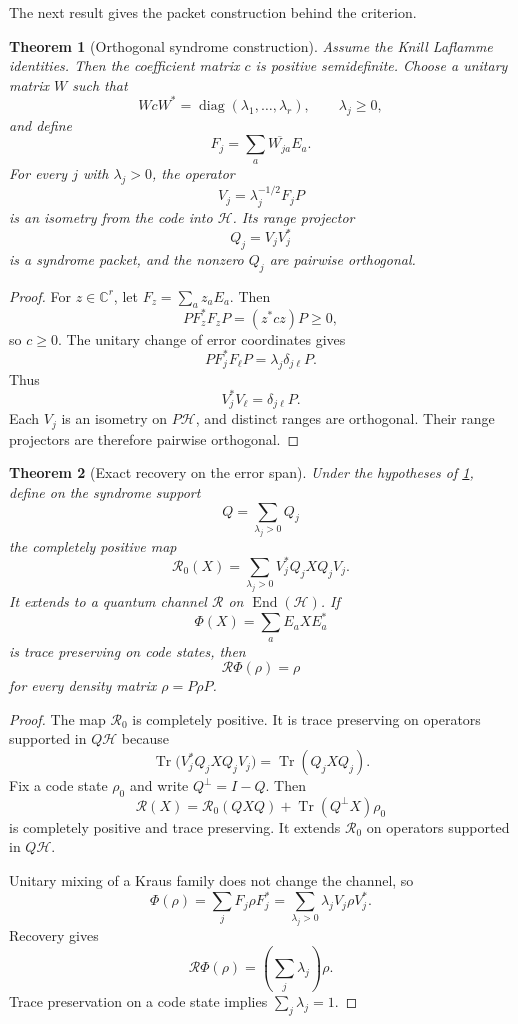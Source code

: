 \documentclass{aomart}
\newtheorem{theorem}{Theorem}[section]
\theoremstyle{definition}
\theoremstyle{remark}
\newcommand{\CC}{\mathbb C}
\newcommand{\Hcal}{\mathcal H}
\newcommand{\Rcal}{\mathcal R}
\newcommand{\End}{\operatorname{End}}
\newcommand{\Tr}{\operatorname{Tr}}
\newcommand{\diag}{\operatorname{diag}}
\begin{document}
The next result gives the packet construction behind the criterion.

\begin{theorem}[Orthogonal syndrome construction]\label{thm:syndrome_construction}
Assume the Knill Laflamme identities. Then the coefficient matrix \(c\) is positive semidefinite. Choose a unitary matrix \(W\) such that
\[
WcW^*=\diag(\lambda_1,\ldots,\lambda_r),
\qquad
\lambda_j\geq0,
\]
and define
\[
F_j=\sum_a\overline{W_{ja}}E_a.
\]
For every \(j\) with \(\lambda_j>0\), the operator
\[
V_j=\lambda_j^{-1/2}F_jP
\]
is an isometry from the code into \(\Hcal\). Its range projector
\[
Q_j=V_jV_j^*
\]
is a syndrome packet, and the nonzero \(Q_j\) are pairwise orthogonal.
\end{theorem}

\begin{proof}
For \(z\in\CC^r\), let \(F_z=\sum_az_aE_a\). Then
\[
PF_z^*F_zP=(z^*cz)P\geq0,
\]
so \(c\geq0\). The unitary change of error coordinates gives
\[
PF_j^*F_\ell P
=
\lambda_j\delta_{j\ell}P.
\]
Thus
\[
V_j^*V_\ell=\delta_{j\ell}P.
\]
Each \(V_j\) is an isometry on \(P\Hcal\), and distinct ranges are orthogonal. Their range projectors are therefore pairwise orthogonal.
\end{proof}

\begin{theorem}[Exact recovery on the error span]\label{thm:exact_recovery}
Under the hypotheses of \cref{thm:syndrome_construction}, define on the syndrome support
\[
Q=\sum_{\lambda_j>0}Q_j
\]
the completely positive map
\[
\Rcal_0(X)
=
\sum_{\lambda_j>0}
V_j^*Q_jXQ_jV_j.
\]
It extends to a quantum channel \(\Rcal\) on \(\End(\Hcal)\). If
\[
\Phi(X)=\sum_aE_aXE_a^*
\]
is trace preserving on code states, then
\[
\Rcal\Phi(\rho)=\rho
\]
for every density matrix \(\rho=P\rho P\).
\end{theorem}

\begin{proof}
The map \(\Rcal_0\) is completely positive. It is trace preserving on operators supported in \(Q\Hcal\) because
\[
\Tr\bigl(V_j^*Q_jXQ_jV_j\bigr)
=
\Tr(Q_jXQ_j).
\]
Fix a code state \(\rho_0\) and write \(Q^\perp=I-Q\). Then
\[
\Rcal(X)
=
\Rcal_0(QXQ)
+
\Tr(Q^\perp X)\rho_0
\]
is completely positive and trace preserving. It extends \(\Rcal_0\) on operators supported in \(Q\Hcal\).

Unitary mixing of a Kraus family does not change the channel, so
\[
\Phi(\rho)
=
\sum_jF_j\rho F_j^*
=
\sum_{\lambda_j>0}
\lambda_jV_j\rho V_j^*.
\]
Recovery gives
\[
\Rcal\Phi(\rho)
=
\left(\sum_j\lambda_j\right)\rho.
\]
Trace preservation on a code state implies \(\sum_j\lambda_j=1\).
\end{proof}
\end{document}
